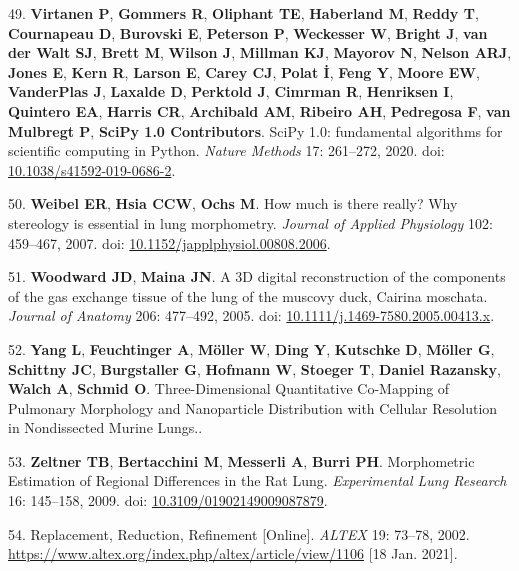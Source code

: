 \documentclass[
  american,
]{article}
\newenvironment{cslreferences}%
  {}%
  {\par}
\begin{document}
\begin{cslreferences}
\leavevmode\hypertarget{ref-8Miti2Gz}{}%
49. \textbf{Virtanen P}, \textbf{Gommers R}, \textbf{Oliphant TE}, \textbf{Haberland M}, \textbf{Reddy T}, \textbf{Cournapeau D}, \textbf{Burovski E}, \textbf{Peterson P}, \textbf{Weckesser W}, \textbf{Bright J}, \textbf{van der Walt SJ}, \textbf{Brett M}, \textbf{Wilson J}, \textbf{Millman KJ}, \textbf{Mayorov N}, \textbf{Nelson ARJ}, \textbf{Jones E}, \textbf{Kern R}, \textbf{Larson E}, \textbf{Carey CJ}, \textbf{Polat İ}, \textbf{Feng Y}, \textbf{Moore EW}, \textbf{VanderPlas J}, \textbf{Laxalde D}, \textbf{Perktold J}, \textbf{Cimrman R}, \textbf{Henriksen I}, \textbf{Quintero EA}, \textbf{Harris CR}, \textbf{Archibald AM}, \textbf{Ribeiro AH}, \textbf{Pedregosa F}, \textbf{van Mulbregt P}, \textbf{SciPy 1.0 Contributors}. SciPy 1.0: fundamental algorithms for scientific computing in Python. \emph{Nature Methods} 17: 261--272, 2020. doi: \href{https://doi.org/10.1038/s41592-019-0686-2}{10.1038/s41592-019-0686-2}.

\leavevmode\hypertarget{ref-1CLJ32t5m}{}%
50. \textbf{Weibel ER}, \textbf{Hsia CCW}, \textbf{Ochs M}. How much is there really? Why stereology is essential in lung morphometry. \emph{Journal of Applied Physiology} 102: 459--467, 2007. doi: \href{https://doi.org/10.1152/japplphysiol.00808.2006}{10.1152/japplphysiol.00808.2006}.

\leavevmode\hypertarget{ref-CPhMy3Ie}{}%
51. \textbf{Woodward JD}, \textbf{Maina JN}. A 3D digital reconstruction of the components of the gas exchange tissue of the lung of the muscovy duck, Cairina moschata. \emph{Journal of Anatomy} 206: 477--492, 2005. doi: \href{https://doi.org/10.1111/j.1469-7580.2005.00413.x}{10.1111/j.1469-7580.2005.00413.x}.

\leavevmode\hypertarget{ref-19jBv0ima}{}%
52. \textbf{Yang L}, \textbf{Feuchtinger A}, \textbf{Möller W}, \textbf{Ding Y}, \textbf{Kutschke D}, \textbf{Möller G}, \textbf{Schittny JC}, \textbf{Burgstaller G}, \textbf{Hofmann W}, \textbf{Stoeger T}, \textbf{Daniel Razansky}, \textbf{Walch A}, \textbf{Schmid O}. Three-Dimensional Quantitative Co-Mapping of Pulmonary Morphology and Nanoparticle Distribution with Cellular Resolution in Nondissected Murine Lungs..

\leavevmode\hypertarget{ref-I9TmP6IU}{}%
53. \textbf{Zeltner TB}, \textbf{Bertacchini M}, \textbf{Messerli A}, \textbf{Burri PH}. Morphometric Estimation of Regional Differences in the Rat Lung. \emph{Experimental Lung Research} 16: 145--158, 2009. doi: \href{https://doi.org/10.3109/01902149009087879}{10.3109/01902149009087879}.

\leavevmode\hypertarget{ref-199ALtdJt}{}%
54. Replacement, Reduction, Refinement {[}Online{]}. \emph{ALTEX} 19: 73--78, 2002. \url{https://www.altex.org/index.php/altex/article/view/1106} {[}18 Jan. 2021{]}.
\end{cslreferences}
\end{document}
